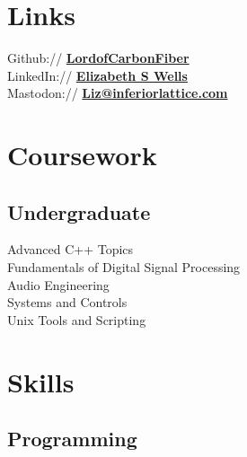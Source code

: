 \documentclass[letterpaper]{deedy-resume-openfont} %
\begin{document}
\begin{minipage}[t]{0.33\textwidth}

\section{Links}

Github:// \href{https://github.com/lordofcarbonfiber}{\bf LordofCarbonFiber } \\
LinkedIn:// \href{https://www.linkedin.com/in/elizabethswells/s}{\bf Elizabeth S Wells} \\
Mastodon:// \href{@liz@mastodon.inferiorlattice.com}{ \bf Liz@inferiorlattice.com} \\




\section{Coursework}

\subsection{Undergraduate}

Advanced C++ Topics \\
Fundamentals of Digital Signal Processing \\
Audio Engineering \\
 Systems and Controls\\
Unix Tools and Scripting

\sectionspace %


\section{Skills}

\subsection{Programming}


\end{minipage}
\end{document}
